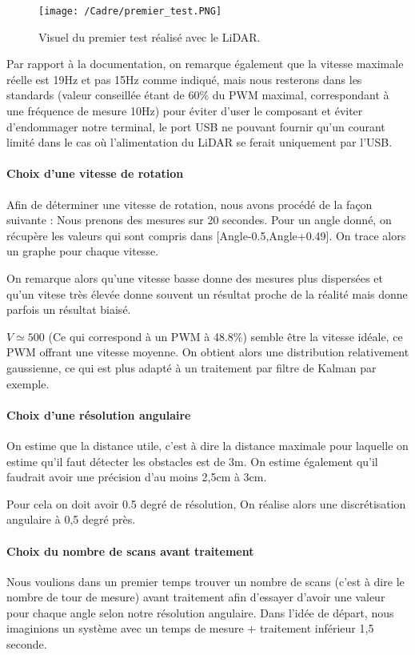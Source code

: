 \begin{figure}[htp]
    \centering
    \texttt{[image: /Cadre/premier\_test.PNG]}
    \caption{Visuel du premier test réalisé avec le LiDAR.}
\end{figure}

\tab Par rapport à la documentation, on remarque également que la vitesse maximale réelle est 19Hz et pas 15Hz comme indiqué, mais nous resterons dans les standards (valeur conseillée étant de 60\% du PWM maximal, correspondant à une fréquence de mesure 10Hz) pour éviter d'user le composant et éviter d'endommager notre terminal, le port USB ne pouvant fournir qu'un courant limité dans le cas où l'alimentation du LiDAR se ferait uniquement par l'USB.

\paragraph{Choix d'une vitesse de rotation}

\tab Afin de déterminer une vitesse de rotation, nous avons procédé de la façon suivante :
Nous prenons des mesures sur 20 secondes. Pour un angle donné, on récupère les valeurs qui sont compris dans [Angle-0.5,Angle+0.49]. On trace alors un graphe pour chaque vitesse.

\tab On remarque alors qu'une vitesse basse donne des mesures plus dispersées et qu'un vitese très élevée donne souvent un résultat proche de la réalité mais donne parfois un résultat biaisé.

\tab $ V \simeq 500$ (Ce qui correspond à un PWM à 48.8\%) semble être la vitesse idéale, ce PWM offrant une vitesse moyenne. On obtient alors une distribution relativement gaussienne, ce qui est plus adapté à un traitement par filtre de Kalman par exemple.


\paragraph{Choix d'une résolution angulaire}
\tab On estime que la distance utile, c'est à dire la distance maximale pour laquelle on estime qu'il faut détecter les obstacles est de 3m.
On estime également qu'il faudrait avoir une précision d'au moins 2,5cm à 3cm.

\tab Pour cela on doit avoir 0.5 degré de résolution, On réalise alors une discrétisation angulaire à 0,5 degré près. 


\paragraph{Choix du nombre de scans avant traitement}
\tab Nous voulions dans un premier temps trouver un nombre de scans (c'est à dire le nombre de tour de mesure) avant traitement afin d'essayer d'avoir une valeur pour chaque angle selon notre résolution angulaire. Dans l'idée de départ, nous imaginions un système avec un temps de mesure + traitement inférieur 1,5 seconde.

